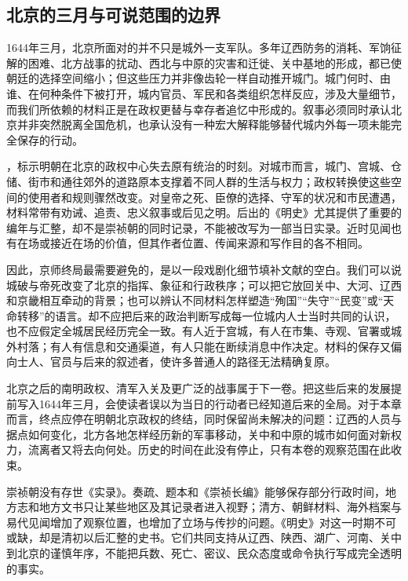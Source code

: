 \subsection{北京的三月与可说范围的边界}

1644年三月，北京所面对的并不只是城外一支军队。多年辽西防务的消耗、军饷征解的困难、北方战事的扰动、西北与中原的灾害和迁徙、关中基地的形成，都已使朝廷的选择空间缩小；但这些压力并非像齿轮一样自动推开城门。城门何时、由谁、在何种条件下被打开，城内官员、军民和各类组织怎样反应，涉及大量细节，而我们所依赖的材料正是在政权更替与幸存者追忆中形成的。叙事必须同时承认北京并非突然脱离全国危机，也承认没有一种宏大解释能够替代城内外每一项未能完全保存的行动。

，标示明朝在北京的政权中心失去原有统治的时刻。对城市而言，城门、宫城、仓储、街市和通往郊外的道路原本支撑着不同人群的生活与权力；政权转换使这些空间的使用者和规则骤然改变。对皇帝之死、臣僚的选择、守军的状况和市民遭遇，材料常带有劝诫、追责、忠义叙事或后见之明。后出的《明史》尤其提供了重要的编年与汇整，却不是崇祯朝的同时记录，不能被改写为一部当日实录。近时见闻也有在场或接近在场的价值，但其作者位置、传闻来源和写作目的各不相同。

因此，京师终局最需要避免的，是以一段戏剧化细节填补文献的空白。我们可以说城破与帝死改变了北京的指挥、象征和行政秩序；可以把它放回关中、大河、辽西和京畿相互牵动的背景；也可以辨认不同材料怎样塑造“殉国”“失守”“民变”或“天命转移”的语言。却不应把后来的政治判断写成每一位城内人士当时共同的认识，也不应假定全城居民经历完全一致。有人近于宫城，有人在市集、寺观、官署或城外村落；有人有信息和交通渠道，有人只能在断续消息中作决定。材料的保存又偏向士人、官员与后来的叙述者，使许多普通人的路径无法精确复原。

北京之后的南明政权、清军入关及更广泛的战事属于下一卷。把这些后来的发展提前写入1644年三月，会使读者误以为当日的行动者已经知道后来的全局。对于本章而言，终点应停在明朝北京政权的终结，同时保留尚未解决的问题：辽西的人员与据点如何变化，北方各地怎样经历新的军事移动，关中和中原的城市如何面对新权力，流离者又将去向何处。历史的时间在此没有停止，只有本卷的观察范围在此收束。

\begin{debate}[为什么不能把末世叙事当作崇祯朝的现场录音]
崇祯朝没有存世《实录》。奏疏、题本和《崇祯长编》能够保存部分行政时间，地方志和地方文书只让某些地区及其记录者进入视野；清方、朝鲜材料、海外档案与易代见闻增加了观察位置，也增加了立场与传抄的问题。《明史》对这一时期不可或缺，却是清初以后汇整的史书。它们共同支持从辽西、陕西、湖广、河南、关中到北京的谨慎年序，不能把兵数、死亡、密议、民众态度或命令执行写成完全透明的事实。
\end{debate}

